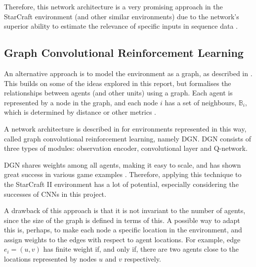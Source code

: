 Therefore, this network architecture is a very promising approach in the StarCraft environment (and other similar environments) due to the network's superior ability to estimate the relevance of specific inputs in sequence data .


\subsection{Graph Convolutional Reinforcement Learning}

An alternative approach is to model the environment as a graph, as described in \cite{graph}. This builds on some of the ideas explored in this report, but formalises the relationships between agents (and other units) using a graph. Each agent is represented by a node in the graph, and each node $i$ has a set of neighbours, $\mathbb{B}_i$, which is determined by distance or other metrics \cite{graph}.

A network architecture is described in \cite{graph} for environments represented in this way, called graph  convolutional reinforcement learning, namely DGN. DGN consists of three types of modules:  observation encoder, convolutional layer and Q-network. 

DGN shares weights among all agents, making it easy to scale, and has shown great success in various game examples \cite{graph}. Therefore, applying this technique to the StarCraft II environment has a lot of potential, especially considering the successes of CNNs in this project. 

A drawback of this approach is that it is not invariant to the number of agents, since the size of the graph is defined in terms of this. A possible way to adapt this is, perhaps, to make each node a specific location in the environment, and assign weights to the edges with respect to agent locations. For example, edge $e_i = (u,v)$ has finite weight if, and only if, there are two agents close to the locations represented by nodes $u$ and $v$ respectively.



